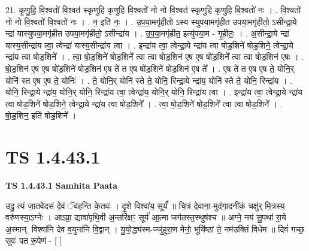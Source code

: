 \documentclass[17pt]{extarticle}
\begin{document}
21. कृ॒णु॒हि॒ वि॒श्वतो॑ वि॒श्वत॑ स्कृणुहि कृणुहि वि॒श्वतो॑ नो नो वि॒श्वत॑ स्कृणुहि कृणुहि वि॒श्वतो॑ नः । . वि॒श्वतो॑ नो नो वि॒श्वतो॑ वि॒श्वतो॑ नः । . न॒ इति॑ नः॒ । . उ॒प॒या॒मगृ॑हीतो ऽस्य स्युपया॒मगृ॑हीत उपया॒मगृ॑हीतो॒ ऽसीन्द्रा॒ये न्द्रा॑ यास्युपया॒मगृ॑हीत उपया॒मगृ॑हीतो॒ ऽसीन्द्रा॑य । . उ॒प॒या॒मगृ॑हीत॒ इत्यु॑पया॒म - गृ॒ही॒तः॒ । . अ॒सीन्द्रा॒ये न्द्रा॑ यास्य॒सीन्द्रा॑य त्वा॒ त्वेन्द्रा॑ यास्य॒सीन्द्रा॑य त्वा । . इन्द्रा॑य त्वा॒ त्वेन्द्रा॒ये न्द्रा॑य त्वा षोड॒शिने॑ षोड॒शिने॒ त्वेन्द्रा॒ये न्द्रा॑य त्वा षोड॒शिने᳚ । . त्वा॒ षो॒ड॒शिने॑ षोड॒शिने᳚ त्वा त्वा षोड॒शिन॑ ए॒ष ए॒ष षो॑ड॒शिने᳚ त्वा त्वा षोड॒शिन॑ ए॒षः । . षो॒ड॒शिन॑ ए॒ष ए॒ष षो॑ड॒शिने॑ षोड॒शिन॑ ए॒ष ते॑ त ए॒ष षो॑ड॒शिने॑ षोड॒शिन॑ ए॒ष ते᳚ । . ए॒ष ते॑ त ए॒ष ए॒ष ते॒ योनि॒र् योनि॑ स्त ए॒ष ए॒ष ते॒ योनिः॑ । . ते॒ योनि॒र् योनि॑ स्ते ते॒ योनि॒ रिन्द्रा॒ये न्द्रा॑य॒ योनि॑ स्ते ते॒ योनि॒ रिन्द्रा॑य । . योनि॒ रिन्द्रा॒ये न्द्रा॑य॒ योनि॒र् योनि॒ रिन्द्रा॑य त्वा॒ त्वेन्द्रा॑य॒ योनि॒र् योनि॒ रिन्द्रा॑य त्वा । . इन्द्रा॑य त्वा॒ त्वेन्द्रा॒ये न्द्रा॑य त्वा षोड॒शिने॑ षोड॒शिने॒ त्वेन्द्रा॒ये न्द्रा॑य त्वा षोड॒शिने᳚ । . त्वा॒ षो॒ड॒शिने॑ षोड॒शिने᳚ त्वा त्वा षोड॒शिने᳚ । . षो॒ड॒शिन॒ इति॑ षोड॒शिने᳚ । \newline
\pagebreak
{}

\section{ TS 1.4.43.1 }

\textbf{TS 1.4.43.1 } \newline
\textbf{Samhita Paata} \newline

उदु॒ त्यं जा॒तवे॑दसं दे॒वं ॅव॑हन्ति के॒तवः॑ । दृ॒शे विश्वा॑य॒ सूर्यं᳚ ॥ चि॒त्रं दे॒वाना॒-मुद॑गा॒दनी॑कं॒ चक्षु॑र् मि॒त्रस्य॒ वरु॑णस्या॒ऽग्नेः । आऽप्रा॒ द्यावा॑पृथि॒वी अ॒न्तरि॑क्षꣳ॒॒ सूर्य॑ आ॒त्मा जग॑तस्त॒स्थुष॑श्च ॥ अग्ने॒ नय॑ सु॒पथा॑ रा॒ये अ॒स्मान्. विश्वा॑नि देव व॒युना॑नि वि॒द्वान् । यु॒यो॒द्ध्य॑स्म-ज्जु॑हुरा॒ण मेनो॒ भूयि॑ष्ठां ते॒ नम॑उक्तिं विधेम ॥ दिवं॑ गच्छ॒ सुवः॑ पत रू॒पेण॑ - [ ] \newline
\end{document}

